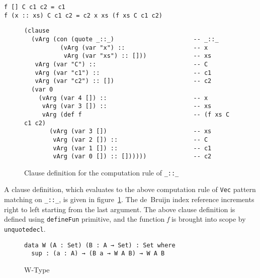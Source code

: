 \documentclass[sigplan,10pt]{acmart}
\begin{document}
\begin{center}
\begingroup
\begin{BVerbatim}
f [] C c1 c2 = c1
f (x :: xs) C c1 c2 = c2 x xs (f xs C c1 c2)
\end{BVerbatim}
\endgroup
\end{center}

\normalsize



\begin{figure}
\begin{center}
\begingroup
\fontsize{7pt}{9pt}\selectfont
\begin{Verbatim}
(clause
  (vArg (con (quote _::_)                      -- _::_
          (vArg (var "x") ::                   -- x
           vArg (var "xs") :: []))             -- xs
   vArg (var "C") ::                           -- C
   vArg (var "c1") ::                          -- c1
   vArg (var "c2") :: [])                      -- c2
  (var 0                                       
    (vArg (var 4 []) ::                        -- x
     vArg (var 3 []) ::                        -- xs
     vArg (def f                               -- (f xs C c1 c2)
       (vArg (var 3 [])                        -- xs
        vArg (var 2 []) ::                     -- C
        vArg (var 1 []) ::                     -- c1
        vArg (var 0 []) :: [])))))             -- c2

\end{Verbatim}
\endgroup
\end{center}
\caption{Clause definition for the computation rule of \texttt{\_::\_}}
\label{fig:ast-cdef}
\end{figure}

\normalsize

A clause definition, which evaluates to the above computation rule of {\tt Vec} pattern matching on {\tt \_::\_}, is given in figure~\ref{fig:ast-cdef}. The de~Bruijn index reference increments right to left starting from the last argument.  The above clause definition is defined using {\tt defineFun} primitive, and the function \emph{f} is brought into scope by {\tt unquotedecl}.
\begin{figure}
\begin{center}
\begingroup
\begin{BVerbatim}
data W (A : Set) (B : A → Set) : Set where
  sup : (a : A) → (B a → W A B) → W A B
\end{BVerbatim}
\endgroup
\end{center}
\caption{W-Type}
\label{fig:W-type}
\end{figure}
\end{document}

